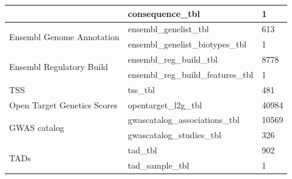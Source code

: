 \begin{table}[h!]
\begin{tabular}{l|l|l}
                                                   & consequence\_tbl                   & 1                                                                                                   \\ \hline
        \multirow{2}{*}{Ensembl Genome Annotation} & ensembl\_genelist\_tbl             & 613                                                                                                 \\
                                                   & ensembl\_genelist\_biotypes\_tbl   & 1                                                                                                   \\ \hline
        \multirow{2}{*}{Ensembl Regulatory Build}  & ensembl\_reg\_build\_tbl           & 8778                                                                                                \\
                                                   & ensembl\_reg\_build\_features\_tbl & 1                                                                                                   \\ \hline
        TSS                                        & tss\_tbl                           & 481                                                                                                 \\ \hline
        Open Target Genetics Scores                & opentarget\_l2g\_tbl               & 40984                                                                                               \\ \hline
        \multirow{2}{*}{GWAS catalog}              & gwascatalog\_associations\_tbl     & 10569                                                                                               \\
                                                   & gwascatalog\_studies\_tbl          & 326                                                                                                 \\ \hline
        \multirow{2}{*}{TADs}                      & tad\_tbl                           & 902                                                                                                 \\
                                                   & tad\_sample\_tbl                   & 1                                                                                                   \\ \hline

\end{tabular}
\end{table}
